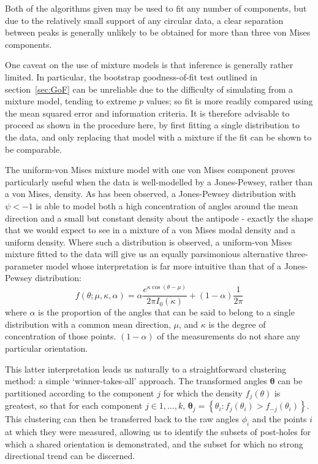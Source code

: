 \documentclass[../../ArchStats.tex]{subfiles}
\begin{document}
Both of the algorithms given may be used to fit any number of components, but due to the relatively small support of any circular data, a clear separation between peaks is generally unlikely to be obtained for more than three von Mises components. 

One caveat on the use of mixture models is that inference is generally rather limited. In particular, the bootstrap goodness-of-fit test outlined in section~\ref{sec:GoF} can be unreliable due to the difficulty of simulating from a mixture model, tending to extreme $p$ values; so fit is more readily compared using the mean squared error and information criteria. It is therefore advisable to proceed as shown in the procedure here, by first fitting a single distribution to the data, and only replacing that model with a mixture if the fit can be shown to be comparable.

The uniform-von Mises mixture model with one von Mises component proves particularly useful when the data is well-modelled by a Jones-Pewsey, rather than a von Mises, density. As has been observed, a Jones-Pewsey distribution with $\psi < -1$ is able to model both  a high concentration of angles around the mean direction and a small but constant density about the antipode - exactly the shape that we would expect to see in a mixture of a von Mises modal density and a uniform density.  Where such a distribution is observed, a uniform-von Mises mixture fitted to the data will give us an equally parsimonious alternative three-parameter model whose interpretation is far more intuitive than that of a Jones-Pewsey distribution:
\begin{equation}
f(\theta; \mu, \kappa, \alpha) = \alpha \frac{e^{\kappa \cos(\theta - \mu)}}{2\pi I_0(\kappa)} + (1-\alpha)\frac{1}{2\pi}
\end{equation}
where $\alpha$ is the proportion of the angles that can be said to belong to a single distribution with a common mean direction, $\mu$, and $\kappa$ is the degree of concentration of those points. $(1-\alpha)$ of the measurements do not share any particular orientation. 

This latter interpretation leads us naturally to a straightforward clustering method: a simple `winner-takes-all' approach. The transformed angles $\boldsymbol{\theta}$ can be partitioned according to the component $j$ for which the density $f_j(\theta)$ is greatest, so that for each component $j \in 1, \dots, k$, $\boldsymbol{\theta}_j = \left\lbrace \theta_i : f_j(\theta_i) > f_{-j}(\theta_i) \right\rbrace$. This clustering can then be transferred back to the raw angles $\phi_i$ and the points $i$ at which they were measured, allowing us to identify the subsets of post-holes for which a shared orientation is demonstrated, and the subset for which no strong directional trend can be discerned.
\end{document}
